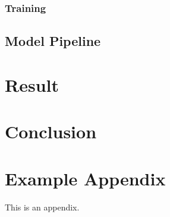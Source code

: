 \documentclass[11pt]{article}
\begin{document}
\subsubsection{Training}

\subsection{Model Pipeline}

\section{Result}

\section{Conclusion}



\appendix

\section{Example Appendix}
\label{sec:appendix}

This is an appendix.
\end{document}
